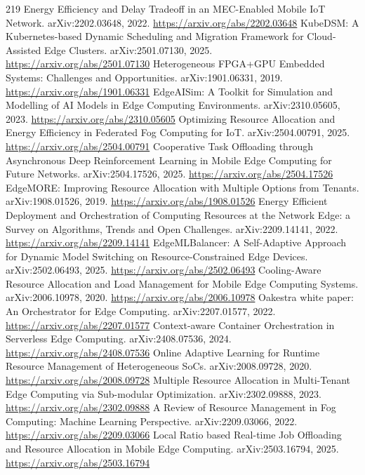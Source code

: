 \documentclass[11pt]{article}
\begin{document}
\begin{thebibliography}{219}
 Energy Efficiency and Delay Tradeoff in an MEC-Enabled Mobile IoT Network. arXiv:2202.03648, 2022. \url{https://arxiv.org/abs/2202.03648}
 KubeDSM: A Kubernetes-based Dynamic Scheduling and Migration Framework for Cloud-Assisted Edge Clusters. arXiv:2501.07130, 2025. \url{https://arxiv.org/abs/2501.07130}
 Heterogeneous FPGA+GPU Embedded Systems: Challenges and Opportunities. arXiv:1901.06331, 2019. \url{https://arxiv.org/abs/1901.06331}
 EdgeAISim: A Toolkit for Simulation and Modelling of AI Models in Edge Computing Environments. arXiv:2310.05605, 2023. \url{https://arxiv.org/abs/2310.05605}
 Optimizing Resource Allocation and Energy Efficiency in Federated Fog Computing for IoT. arXiv:2504.00791, 2025. \url{https://arxiv.org/abs/2504.00791}
 Cooperative Task Offloading through Asynchronous Deep Reinforcement Learning in Mobile Edge Computing for Future Networks. arXiv:2504.17526, 2025. \url{https://arxiv.org/abs/2504.17526}
 EdgeMORE: Improving Resource Allocation with Multiple Options from Tenants. arXiv:1908.01526, 2019. \url{https://arxiv.org/abs/1908.01526}
 Energy Efficient Deployment and Orchestration of Computing Resources at the Network Edge: a Survey on Algorithms, Trends and Open Challenges. arXiv:2209.14141, 2022. \url{https://arxiv.org/abs/2209.14141}
 EdgeMLBalancer: A Self-Adaptive Approach for Dynamic Model Switching on Resource-Constrained Edge Devices. arXiv:2502.06493, 2025. \url{https://arxiv.org/abs/2502.06493}
 Cooling-Aware Resource Allocation and Load Management for Mobile Edge Computing Systems. arXiv:2006.10978, 2020. \url{https://arxiv.org/abs/2006.10978}
 Oakestra white paper: An Orchestrator for Edge Computing. arXiv:2207.01577, 2022. \url{https://arxiv.org/abs/2207.01577}
 Context-aware Container Orchestration in Serverless Edge Computing. arXiv:2408.07536, 2024. \url{https://arxiv.org/abs/2408.07536}
 Online Adaptive Learning for Runtime Resource Management of Heterogeneous SoCs. arXiv:2008.09728, 2020. \url{https://arxiv.org/abs/2008.09728}
 Multiple Resource Allocation in Multi-Tenant Edge Computing via Sub-modular Optimization. arXiv:2302.09888, 2023. \url{https://arxiv.org/abs/2302.09888}
 A Review of Resource Management in Fog Computing: Machine Learning Perspective. arXiv:2209.03066, 2022. \url{https://arxiv.org/abs/2209.03066}
 Local Ratio based Real-time Job Offloading and Resource Allocation in Mobile Edge Computing. arXiv:2503.16794, 2025. \url{https://arxiv.org/abs/2503.16794}

\end{thebibliography}
\end{document}
